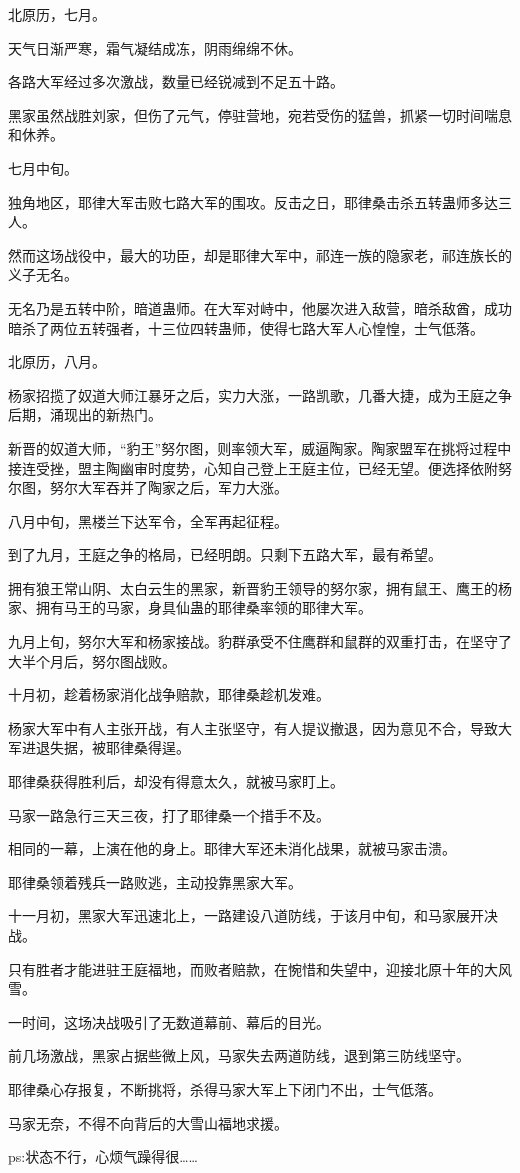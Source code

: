\begin{this_body}
北原历，七月。

天气日渐严寒，霜气凝结成冻，阴雨绵绵不休。

各路大军经过多次激战，数量已经锐减到不足五十路。

黑家虽然战胜刘家，但伤了元气，停驻营地，宛若受伤的猛兽，抓紧一切时间喘息和休养。

七月中旬。

独角地区，耶律大军击败七路大军的围攻。反击之日，耶律桑击杀五转蛊师多达三人。

然而这场战役中，最大的功臣，却是耶律大军中，祁连一族的隐家老，祁连族长的义子无名。

无名乃是五转中阶，暗道蛊师。在大军对峙中，他屡次进入敌营，暗杀敌酋，成功暗杀了两位五转强者，十三位四转蛊师，使得七路大军人心惶惶，士气低落。

北原历，八月。

杨家招揽了奴道大师江暴牙之后，实力大涨，一路凯歌，几番大捷，成为王庭之争后期，涌现出的新热门。

新晋的奴道大师，“豹王”努尔图，则率领大军，威逼陶家。陶家盟军在挑将过程中接连受挫，盟主陶幽审时度势，心知自己登上王庭主位，已经无望。便选择依附努尔图，努尔大军吞并了陶家之后，军力大涨。

八月中旬，黑楼兰下达军令，全军再起征程。

到了九月，王庭之争的格局，已经明朗。只剩下五路大军，最有希望。

拥有狼王常山阴、太白云生的黑家，新晋豹王领导的努尔家，拥有鼠王、鹰王的杨家、拥有马王的马家，身具仙蛊的耶律桑率领的耶律大军。

九月上旬，努尔大军和杨家接战。豹群承受不住鹰群和鼠群的双重打击，在坚守了大半个月后，努尔图战败。

十月初，趁着杨家消化战争赔款，耶律桑趁机发难。

杨家大军中有人主张开战，有人主张坚守，有人提议撤退，因为意见不合，导致大军进退失据，被耶律桑得逞。

耶律桑获得胜利后，却没有得意太久，就被马家盯上。

马家一路急行三天三夜，打了耶律桑一个措手不及。

相同的一幕，上演在他的身上。耶律大军还未消化战果，就被马家击溃。

耶律桑领着残兵一路败逃，主动投靠黑家大军。

十一月初，黑家大军迅速北上，一路建设八道防线，于该月中旬，和马家展开决战。

只有胜者才能进驻王庭福地，而败者赔款，在惋惜和失望中，迎接北原十年的大风雪。

一时间，这场决战吸引了无数道幕前、幕后的目光。

前几场激战，黑家占据些微上风，马家失去两道防线，退到第三防线坚守。

耶律桑心存报复，不断挑将，杀得马家大军上下闭门不出，士气低落。

马家无奈，不得不向背后的大雪山福地求援。

ps:状态不行，心烦气躁得很……

\end{this_body}

